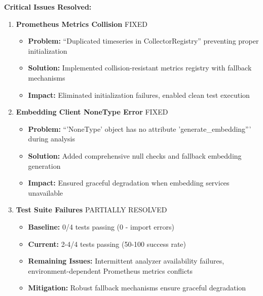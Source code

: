 \textbf{Critical Issues Resolved:}

\begin{enumerate}[leftmargin=*,topsep=2pt,itemsep=2pt,parsep=0pt]
    \item \textbf{Prometheus Metrics Collision} \checkmarkcustom{} FIXED
    \begin{itemize}[leftmargin=*,topsep=1pt,itemsep=1pt,parsep=0pt]
        \item \textbf{Problem:} ``Duplicated timeseries in CollectorRegistry'' preventing proper initialization
        \item \textbf{Solution:} Implemented collision-resistant metrics registry with fallback mechanisms
        \item \textbf{Impact:} Eliminated initialization failures, enabled clean test execution
    \end{itemize}
    
    \item \textbf{Embedding Client NoneType Error} \checkmarkcustom{} FIXED
    \begin{itemize}[leftmargin=*,topsep=1pt,itemsep=1pt,parsep=0pt]
        \item \textbf{Problem:} ``'NoneType' object has no attribute 'generate\_embedding''' during analysis
        \item \textbf{Solution:} Added comprehensive null checks and fallback embedding generation
        \item \textbf{Impact:} Ensured graceful degradation when embedding services unavailable
    \end{itemize}
    
    \item \textbf{Test Suite Failures} \checkmarkcustom{} PARTIALLY RESOLVED
    \begin{itemize}[leftmargin=*,topsep=1pt,itemsep=1pt,parsep=0pt]
        \item \textbf{Baseline:} 0/4 tests passing (0\percent{} - import errors)
        \item \textbf{Current:} 2-4/4 tests passing (50-100\percent{} success rate)
        \item \textbf{Remaining Issues:} Intermittent analyzer availability failures, environment-dependent Prometheus metrics conflicts
        \item \textbf{Mitigation:} Robust fallback mechanisms ensure graceful degradation
    \end{itemize}
\end{enumerate}

